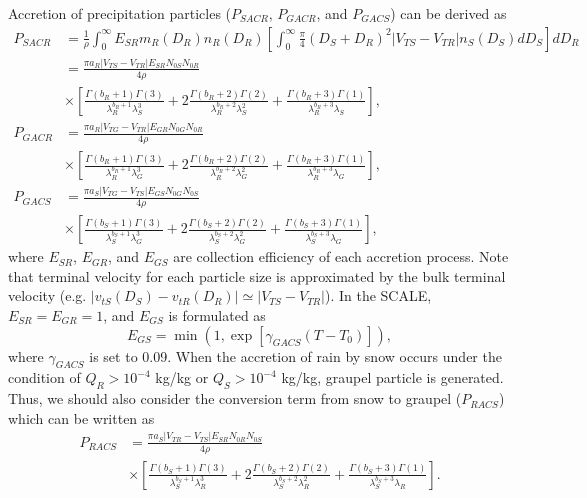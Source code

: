 Accretion of precipitation particles ($P_{SACR}$, $P_{GACR}$, and $P_{GACS}$) can be derived as
\begin{align}
  P_{SACR}&= \frac{1}{\rho}\int_{0}^{\infty}E_{SR}m_{R}(D_{R})n_{R}(D_{R})\left[\int_{0}^{\infty}\frac{\pi}{4}(D_{S}+D_{R})^{2}|V_{TS}-V_{TR}|n_{S}(D_{S})dD_{S}\right]dD_{R} \nonumber \\
  &=\frac{\pi a_{R}|V_{TS}-V_{TR}|E_{SR}N_{0S}N_{0R}}{4\rho} \nonumber \\
  &\times\left[\frac{\Gamma(b_{R}+1)\Gamma(3)}{\lambda^{b_{R}+1}_{R}\lambda^{3}_{S}}+2\frac{\Gamma(b_{R}+2)\Gamma(2)}{\lambda^{b_{R}+2}_{R}\lambda^{2}_{S}}+\frac{\Gamma(b_{R}+3)\Gamma(1)}{\lambda^{b_{R}+3}_{R}\lambda_{S}}\right], \\
  P_{GACR}&=\frac{\pi a_{R}|V_{TG}-V_{TR}|E_{GR}N_{0G}N_{0R}}{4\rho} \nonumber \\
  &\times\left[\frac{\Gamma(b_{R}+1)\Gamma(3)}{\lambda^{b_{R}+1}_{R}\lambda^{3}_{G}}+2\frac{\Gamma(b_{R}+2)\Gamma(2)}{\lambda^{b_{R}+2}_{R}\lambda^{2}_{G}}+\frac{\Gamma(b_{R}+3)\Gamma(1)}{\lambda^{b_{R}+3}_{R}\lambda_{G}}\right], \\
  P_{GACS}&=\frac{\pi a_{S}|V_{TG}-V_{TS}|E_{GS}N_{0G}N_{0S}}{4\rho} \nonumber \\
  &\times\left[\frac{\Gamma(b_{S}+1)\Gamma(3)}{\lambda^{b_{S}+1}_{S}\lambda^{3}_{G}}+2\frac{\Gamma(b_{S}+2)\Gamma(2)}{\lambda^{b_{S}+2}_{S}\lambda^{2}_{G}}+\frac{\Gamma(b_{S}+3)\Gamma(1)}{\lambda^{b_{S}+3}_{S}\lambda_{G}}\right],
\end{align}
where $E_{SR}$, $E_{GR}$, and $E_{GS}$ are collection efficiency of each accretion process. Note that terminal velocity for each particle size is approximated by the bulk terminal velocity (e.g. $|v_{tS}(D_{S})-v_{tR}(D_{R})| \simeq |V_{TS}-V_{TR}|$). In the SCALE, $E_{SR} = E_{GR} = 1$, and $E_{GS}$ is formulated as
\begin{equation}
  E_{GS}=\min(1,\exp[\gamma_{GACS}(T-T_{0})]),
\end{equation}
where $\gamma_{GACS}$ is set to 0.09. When the accretion of rain by snow occurs under the condition of $Q_{R} > 10^{-4}$ kg/kg or $Q_{S} > 10^{-4}$ kg/kg, graupel particle is generated. Thus, we should also consider the conversion term from snow to graupel ($P_{RACS}$) which can be written as
\begin{align}
  P_{RACS}&=\frac{\pi a_{S}|V_{TR}-V_{TS}|E_{SR}N_{0R}N_{0S}}{4\rho} \nonumber \\
  &\times\left[\frac{\Gamma(b_{S}+1)\Gamma(3)}{\lambda^{b_{S}+1}_{S}\lambda^{3}_{R}}+2\frac{\Gamma(b_{S}+2)\Gamma(2)}{\lambda^{b_{S}+2}_{S}\lambda^{2}_{R}}+\frac{\Gamma(b_{S}+3)\Gamma(1)}{\lambda^{b_{S}+3}_{S}\lambda_{R}}\right].
\end{align}

